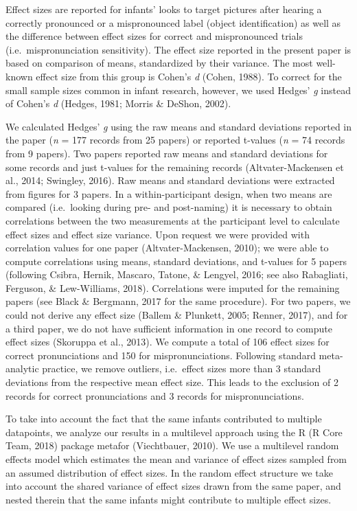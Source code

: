 \documentclass[man]{apa6}
\begin{document}
Effect sizes are reported for infants' looks to target pictures after hearing a correctly pronounced or a mispronounced label (object identification) as well as the difference between effect sizes for correct and mispronounced trials (i.e.~mispronunciation sensitivity). The effect size reported in the present paper is based on comparison of means, standardized by their variance. The most well-known effect size from this group is Cohen's \emph{d} (Cohen, 1988). To correct for the small sample sizes common in infant research, however, we used Hedges' \emph{g} instead of Cohen's \emph{d} (Hedges, 1981; Morris \& DeShon, 2002).

We calculated Hedges' \emph{g} using the raw means and standard deviations reported in the paper (\emph{n} = 177 records from 25 papers) or reported t-values (\emph{n} = 74 records from 9 papers). Two papers reported raw means and standard deviations for some records and just t-values for the remaining records (Altvater-Mackensen et al., 2014; Swingley, 2016). Raw means and standard deviations were extracted from figures for 3 papers. In a within-participant design, when two means are compared (i.e.~looking during pre- and post-naming) it is necessary to obtain correlations between the two measurements at the participant level to calculate effect sizes and effect size variance. Upon request we were provided with correlation values for one paper (Altvater-Mackensen, 2010); we were able to compute correlations using means, standard deviations, and t-values for 5 papers (following Csibra, Hernik, Mascaro, Tatone, \& Lengyel, 2016; see also Rabagliati, Ferguson, \& Lew-Williams, 2018). Correlations were imputed for the remaining papers (see Black \& Bergmann, 2017 for the same procedure). For two papers, we could not derive any effect size (Ballem \& Plunkett, 2005; Renner, 2017), and for a third paper, we do not have sufficient information in one record to compute effect sizes (Skoruppa et al., 2013). We compute a total of 106 effect sizes for correct pronunciations and 150 for mispronunciations. Following standard meta-analytic practice, we remove outliers, i.e.~effect sizes more than 3 standard deviations from the respective mean effect size. This leads to the exclusion of 2 records for correct pronunciations and 3 records for mispronunciations.

To take into account the fact that the same infants contributed to multiple datapoints, we analyze our results in a multilevel approach using the R (R Core Team, 2018) package metafor (Viechtbauer, 2010). We use a multilevel random effects model which estimates the mean and variance of effect sizes sampled from an assumed distribution of effect sizes. In the random effect structure we take into account the shared variance of effect sizes drawn from the same paper, and nested therein that the same infants might contribute to multiple effect sizes.
\end{document}

